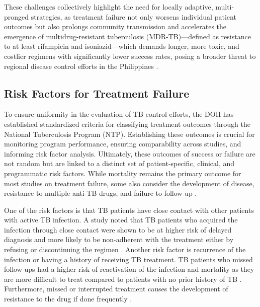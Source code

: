 \documentclass[12pt]{article}
\begin{document}
These challenges collectively highlight the need for locally adaptive, multi-pronged strategies, as treatment failure not only worsens individual patient outcomes but also prolongs community transmission and accelerates the emergence of multidrug-resistant tuberculosis (MDR-TB)---defined as resistance to at least rifampicin and isoniazid---which demands longer, more toxic, and costlier regimens with significantly lower success rates, posing a broader threat to regional disease control efforts in the Philippines \citep{ref28,ref35,ref36}.
\subsection{Risk Factors for Treatment Failure}

To ensure uniformity in the evaluation of TB control efforts, the DOH has established standardized criteria for classifying treatment outcomes through the National Tuberculosis Program (NTP). Establishing these outcomes is crucial for monitoring program performance, ensuring comparability across studies, and informing risk factor analysis. Ultimately, these outcomes of success or failure are not random but are linked to a distinct set of patient-specific, clinical, and programmatic risk factors. While mortality remains the primary outcome for most studies on treatment failure, some also consider the development of disease, resistance to multiple anti-TB drugs, and failure to follow up \citep{ref6}.

One of the risk factors is that TB patients have close contact with other patients with active TB infection. A study noted that TB patients who acquired the infection through close contact were shown to be at higher risk of delayed diagnosis and more likely to be non-adherent with the treatment either by refusing or discontinuing the regimen \citep{ref7}. Another risk factor is recurrence of the infection or having a history of receiving TB treatment. TB patients who missed follow-ups had a higher risk of reactivation of the infection and mortality as they are more difficult to treat compared to patients with no prior history of TB \citep{ref21}. Furthermore, missed or interrupted treatment causes the development of resistance to the drug if done frequently \citep{ref13}.
\end{document}
